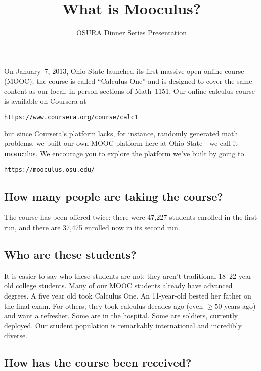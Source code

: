 \documentclass[12pt]{amsart}
\title{What is Mooculus?}
\author{OSURA Dinner Series Presentation}
\newcommand{\mooculus}{\textsf{\textbf{mooc}ulus}}
\begin{document}
\maketitle
\pagestyle{empty}
\thispagestyle{empty} 

On January~7, 2013, Ohio State launched its first massive open online
course (MOOC); the course is called ``Calculus One'' and is designed
to cover the same content as our local, in-person sections of
Math~1151.  Our online calculus course is available on Coursera at
\begin{center}
\texttt{https://www.coursera.org/course/calc1}
\end{center}
but since Coursera's platform lacks, for instance, randomly generated
math problems, we built our own MOOC platform here at Ohio State---we
call it \mooculus.  We encourage you to explore the platform we've
built by going to
\begin{center}
\texttt{https://mooculus.osu.edu/}
\end{center}

\subsection*{How many people are taking the course?}

The course has been offered twice: there were 47,227 students enrolled
in the first run, and there are 37,475 enrolled now in its second run.


\subsection*{Who are these students?}

It is easier to say who these students are not: they aren't
traditional 18--22 year old college students.  Many of our MOOC
students already have advanced degrees.  A five year old took Calculus
One.  An 11-year-old bested her father on the final exam.  For others,
they took calculus decades ago (even $\geq 50$ years ago) and want a
refresher.  Some are in the hospital.  Some are soldiers, currently
deployed.  Our student population is remarkably international and
incredibly diverse.

\subsection*{How has the course been received?}
\end{document}

